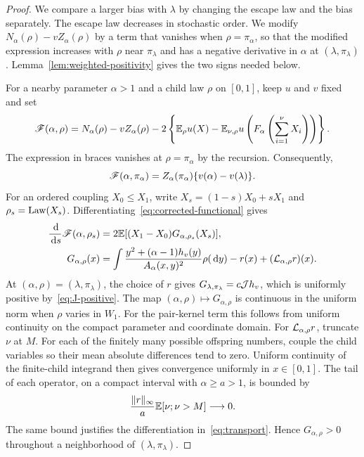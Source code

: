 \begin{proof}
We compare a larger bias with $\lambda$ by changing the escape law and the bias separately. The escape law decreases in stochastic order. We modify $N_\alpha(\rho)-vZ_\alpha(\rho)$ by a term that vanishes when $\rho=\pi_\alpha$, so that the modified expression increases with $\rho$ near $\pi_\lambda$ and has a negative derivative in $\alpha$ at $(\lambda,\pi_\lambda)$. Lemma~\ref{lem:weighted-positivity} gives the two signs needed below.

For a nearby parameter $\alpha>1$ and a child law $\rho$ on $[0,1]$, keep $u$ and $v$ fixed and set
\begin{align}\label{eq:corrected-functional}
 \mathscr F(\alpha,\rho)
 =N_\alpha(\rho)-vZ_\alpha(\rho)
 -2\left\{\mathbb E_\rho u(X)
 -\mathbb E_{\nu,\rho}u\left(F_\alpha\left(\sum_{i=1}^{\nu}X_i\right)\right)\right\}.
\end{align}
The expression in braces vanishes at $\rho=\pi_\alpha$ by the recursion. Consequently,
\begin{equation}\label{eq:on-curve}
 \mathscr F(\alpha,\pi_\alpha)
 =Z_\alpha(\pi_\alpha)\{v(\alpha)-v(\lambda)\}.
\end{equation}
For an ordered coupling $X_0\le X_1$, write $X_s=(1-s)X_0+sX_1$ and $\rho_s=\operatorname{Law}(X_s)$. Differentiating~\eqref{eq:corrected-functional} gives
\begin{align}\label{eq:transport}
 \frac{\,\mathrm d}{\,\mathrm d s}\mathscr F(\alpha,\rho_s)
 &=2\mathbb E[(X_1-X_0)G_{\alpha,\rho_s}(X_s)],\\
 G_{\alpha,\rho}(x)
 &=\int\frac{y^2+(\alpha-1)h_v(y)}{A_\alpha(x,y)^2}\rho(\,\mathrm d y)
 -r(x)+(\mathcal L_{\alpha,\rho}r)(x).\notag
\end{align}
At $(\alpha,\rho)=(\lambda,\pi_\lambda)$, the choice of $r$ gives $G_{\lambda,\pi_\lambda}=c\mathcal J h_v$, which is uniformly positive by~\eqref{eq:J-positive}. The map $(\alpha,\rho)\mapsto G_{\alpha,\rho}$ is continuous in the uniform norm when $\rho$ varies in $W_1$. For the pair-kernel term this follows from uniform continuity on the compact parameter and coordinate domain. For $\mathcal L_{\alpha,\rho}r$, truncate $\nu$ at $M$. For each of the finitely many possible offspring numbers, couple the child variables so their mean absolute differences tend to zero. Uniform continuity of the finite-child integrand then gives convergence uniformly in $x\in[0,1]$. The tail of each operator, on a compact interval with $\alpha\ge a>1$, is bounded by
\begin{equation*}
 \frac{\|r\|_\infty}{a}\mathbb E[\nu;\nu>M]\longrightarrow0.
\end{equation*}
The same bound justifies the differentiation in~\eqref{eq:transport}. Hence $G_{\alpha,\rho}>0$ throughout a neighborhood of $(\lambda,\pi_\lambda)$.


\end{proof}
